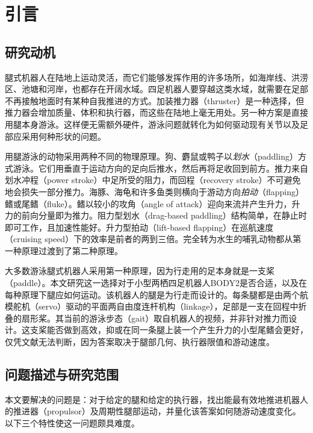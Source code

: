 \chapter{引言}
\label{ch:intro}

\section{研究动机}

腿式机器人在陆地上运动灵活，而它们能够发挥作用的许多场所，如海岸线、洪涝区、池塘和河岸，也都存在开阔水域。四足机器人要穿越这类水域，就需要在足部不再接触地面时有某种自我推进的方式。加装推力器（thruster）是一种选择\cite{Yao2023}，但推力器会增加质量、体积和执行器，而这些在陆地上毫无用处。另一种方案是直接用腿本身游泳\cite{Li2019,Qu2025,Han2025,Wang2025}。这样便无需额外硬件，游泳问题就转化为如何驱动现有关节以及足部应采用何种形状的问题。

用腿游泳的动物采用两种不同的物理原理\cite{Fish1996}。狗、麝鼠或鸭子以\emph{划水}（paddling）方式游泳。它们用垂直于运动方向的足向后推水，然后再将足收回到前方\cite{Fish1984,Fish2021DogPaddle}。推力来自划水冲程（power stroke）中足所受的阻力，而回程（recovery stroke）不可避免地会损失一部分推力。海豚、海龟和许多鱼类则横向于游动方向\emph{拍动}（flapping）鳍或尾鳍（fluke）。鳍以较小的攻角（angle of attack）迎向来流并产生升力，升力的前向分量即为推力。阻力型划水（drag-based paddling）结构简单，在静止时即可工作，且加速性能好。升力型拍动（lift-based flapping）在巡航速度（cruising speed）下的效率是前者的两到三倍\cite{Fish1996,Walker2000}。完全转为水生的哺乳动物都从第一种原理过渡到了第二种原理。

大多数游泳腿式机器人采用第一种原理，因为行走用的足本身就是一支桨（paddle）。本文研究这一选择对于小型两栖四足机器人BODY2是否合适，以及在每种原理下腿应如何运动。该机器人的腿是为行走而设计的。每条腿都是由两个航模舵机（servo）驱动的平面两自由度连杆机构（linkage），足部是一支在回程中折叠的扇形桨。其当前的游泳步态（gait）取自机器人的视频，并非针对推力而设计。这支桨能否做到高效，抑或在同一条腿上装一个产生升力的小型尾鳍会更好，仅凭文献无法判断，因为答案取决于腿部几何、执行器限值和游动速度。

\section{问题描述与研究范围}

本文要解决的问题是：对于给定的腿和给定的执行器，找出能最有效地推进机器人的推进器（propulsor）及周期性腿部运动，并量化该答案如何随游动速度变化。以下三个特性使这一问题颇具难度。

